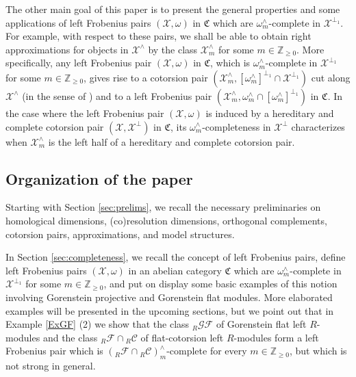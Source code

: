 \documentclass[10pt,reqno]{amsart}
\numberwithin{equation}{section}
\theoremstyle{remark}
\newcommand{\C}{\mathfrak{C}}
\newcommand{\X}{\mathcal{X}}
\begin{document}
The other main goal of this paper is to present the general properties and some applications of left Frobenius pairs $(\X,\omega)$ in $\C$ which are $\omega^\wedge_m$-complete in $\X^{\perp_1}$. For example, with respect to these pairs, we shall be able to obtain right approximations for objects in $\X^\wedge$ by the class $\X^\wedge_m$ for some $m \in \mathbb{Z}_{\geq 0}$. More specifically, any left Frobenius pair $(\X,\omega)$ in $\C$, which is $\omega^\wedge_m$-complete in $\X^{\perp_1}$ for some $m \in \mathbb{Z}_{\geq 0}$, gives rise to a cotorsion pair $(\X^\wedge_m,[\omega^\wedge_m]^{\perp_1} \cap \X^{\perp_1})$ cut along $\X^\wedge$ (in the sense of \cite{HMP-cut}) and to a left Frobenius pair $(\X^\wedge_m, \omega^\wedge_m \cap [\omega^\wedge_m]^{\perp_1})$ in $\C$. In the case where the left Frobenius pair $(\X,\omega)$ is induced by a hereditary and complete cotorsion pair $(\X,\X^\perp)$ in $\C$, its $\omega^\wedge_m$-completeness in $\X^\perp$ characterizes when $\X^\wedge_m$ is the left half of a hereditary and complete cotorsion pair. 



\subsection*{Organization of the paper}

Starting with Section \ref{sec:prelims}, we recall the necessary preliminaries on homological dimensions, (co)resolution dimensions, orthogonal complements, cotorsion pairs, approximations, and model structures.  

In Section \ref{sec:completeness}, we recall the concept of left Frobenius pairs, define left Frobenius pairs $(\X,\omega)$ in an abelian category $\C$ which are $\omega^\wedge_m$-complete in $\X^{\perp_1}$ for some $m \in \mathbb{Z}_{\geq 0}$, and put on display some basic examples of this notion involving Gorenstein projective and Gorenstein flat modules. More elaborated examples will be presented in the upcoming sections, but we point out that in Example \ref{ExGF} (2) we show that the class ${}_R\mathcal{GF}$ of Gorenstein flat left $R$-modules and the class ${}_R\mathcal{F} \cap {}_R\mathcal{C}$ of flat-cotorsion left $R$-modules form a left Frobenius pair which is $({}_R\mathcal{F} \cap {}_R\mathcal{C})^\wedge_m$-complete for every $m \in \mathbb{Z}_{\geq 0}$, but which is not strong in general.
\end{document}
